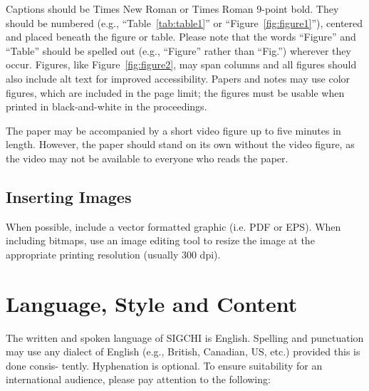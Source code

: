 \documentclass{sigchi}
\begin{document}
Captions should be Times New Roman or Times Roman 9-point bold.  They
should be numbered (e.g., ``Table~\ref{tab:table1}'' or
``Figure~\ref{fig:figure1}''), centered and placed beneath the figure
or table.  Please note that the words ``Figure'' and ``Table'' should
be spelled out (e.g., ``Figure'' rather than ``Fig.'') wherever they
occur. Figures, like Figure~\ref{fig:figure2}, may span columns and
all figures should also include alt text for improved accessibility.
Papers and notes may use color figures, which are included in the page
limit; the figures must be usable when printed in black-and-white in
the proceedings.

The paper may be accompanied by a short video figure up to five
minutes in length. However, the paper should stand on its own without
the video figure, as the video may not be available to everyone who
reads the paper.  

\subsection{Inserting Images}
When possible, include a vector formatted graphic (i.e. PDF or EPS).
When including bitmaps,  use an image editing tool to resize the image
at the appropriate printing resolution (usually 300 dpi).

\section{Language, Style and Content}

The written and spoken language of SIGCHI is English. Spelling and
punctuation may use any dialect of English (e.g., British, Canadian,
US, etc.) provided this is done consis- tently. Hyphenation is
optional. To ensure suitability for an international audience, please
pay attention to the following:
\end{document}
